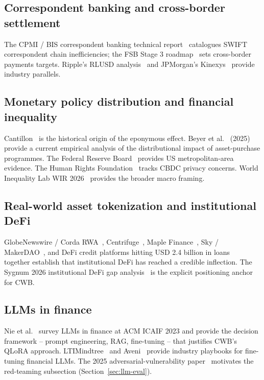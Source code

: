 \documentclass[12pt,a4paper]{report}
\begin{document}
\subsection{Correspondent banking and cross-border settlement}
The CPMI / BIS correspondent banking technical report~\cite{cpmi2016correspondent} catalogues SWIFT correspondent chain inefficiencies; the FSB Stage 3 roadmap~\cite{fsb2020crossborder} sets cross-border payments targets. Ripple's RLUSD analysis~\cite{rippleRlusd2026} and JPMorgan's Kinexys~\cite{jpmKinexys2025} provide industry parallels.

\subsection{Monetary policy distribution and financial inequality}
Cantillon~\cite{cantillon1755essay} is the historical origin of the eponymous effect. Beyer et al.~\cite{beyer2025monetary} (2025) provide a current empirical analysis of the distributional impact of asset-purchase programmes. The Federal Reserve Board~\cite{federalReserve2025distribution} provides US metropolitan-area evidence. The Human Rights Foundation~\cite{hrf2025cbdc} tracks CBDC privacy concerns. World Inequality Lab WIR 2026~\cite{wir2026} provides the broader macro framing.

\subsection{Real-world asset tokenization and institutional DeFi}
GlobeNewswire / Corda RWA~\cite{cordaRwa2025}, Centrifuge~\cite{centrifugeRwa2025}, Maple Finance~\cite{fensoryMaple2026}, Sky / MakerDAO~\cite{fensorySky2026}, and DeFi credit platforms hitting USD 2.4 billion in loans~\cite{fensoryCredit2026} together establish that institutional DeFi has reached a credible inflection. The Sygnum 2026 institutional DeFi gap analysis~\cite{sygnum2026defi} is the explicit positioning anchor for CWB.

\subsection{LLMs in finance}
Nie et al.~\cite{nie2023llmFinance} survey LLMs in finance at ACM ICAIF 2023 and provide the decision framework -- prompt engineering, RAG, fine-tuning -- that justifies CWB's QLoRA approach. LTIMindtree~\cite{ltimindtreeLlm2025} and Aveni~\cite{aveniLlm2025} provide industry playbooks for fine-tuning financial LLMs. The 2025 adversarial-vulnerability paper~\cite{llmFinanceVuln2025} motivates the red-teaming subsection (Section~\ref{sec:llm-eval}).
\end{document}
